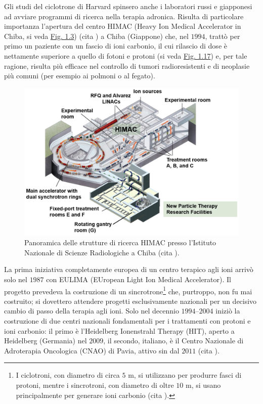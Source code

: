 \documentclass[12pt,a4paper,twoside]{report}
\begin{document}
	Gli studi del ciclotrone di Harvard spinsero anche i laboratori russi e giapponesi ad avviare programmi di ricerca nella terapia adronica. Risulta di particolare importanza l'apertura del centro HIMAC (Heavy Ion Medical Accelerator in Chiba, si veda \hyperref[fig:himac]{Fig. 1.3}) (cita
	) a Chiba (Giappone) che, nel $1994$, trattò per primo un paziente con un fascio di ioni carbonio, il cui rilascio di dose è nettamente superiore a quello di fotoni e protoni (si veda \hyperref[fig:photon]{Fig. 1.17}) e, per tale ragione, risulta più efficace nel controllo di tumori radioresistenti e di neoplasie più comuni (per esempio ai polmoni o al fegato).
	\begin{figure}[H]
		\centering
		\includegraphics[width=0.9\linewidth]{himac.png}
		\caption{Panoramica delle strutture di ricerca HIMAC presso l'Istituto Nazionale di Scienze Radiologiche a Chiba (cita
			).}
		\label{fig:himac}
	\end{figure}
	La prima iniziativa completamente europea di un centro terapico agli ioni arrivò solo nel $1987$ con EULIMA (EUropean Light Ion Medical Accelerator). Il progetto prevedeva la costruzione di un sincrotrone\footnote{I ciclotroni, con diametro di circa $5\mbox{ m}$, si utilizzano per produrre fasci di protoni, mentre i sincrotroni, con diametro di oltre $10\mbox{ m}$, si usano principalmente per generare ioni carbonio (cita
	).} che, purtroppo, non fu mai costruito; si dovettero attendere progetti esclusivamente nazionali per un decisivo cambio di passo della terapia agli ioni. Solo nel decennio $1994$--$2004$ iniziò la costruzione di due centri nazionali fondamentali per i trattamenti con protoni e ioni carbonio: il primo è l'Heidelberg Ionenstrahl Therapy (HIT), aperto a Heidelberg (Germania) nel $2009$, il secondo, italiano, è il Centro Nazionale di Adroterapia Oncologica (CNAO) di Pavia, attivo sin dal $2011$ (cita
	).
	
\end{document}
